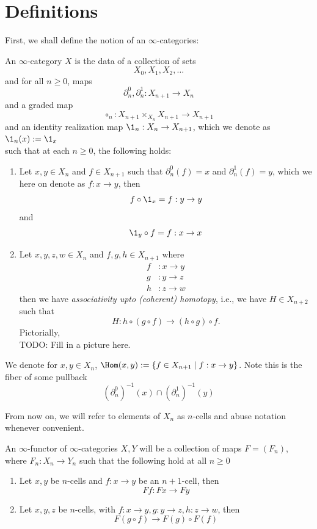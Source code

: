 \section{Definitions}

First, we shall define the notion of an $\infty$-categories:

  An $\infty$-category $X$ is the data of a collection of sets 
\[
    X_0, X_1, X_2, \ldots 
\]
  and for all $n \geq 0$,
  maps \[\partial_n^0, \partial_n^1 : X_{n+1} \rightarrow X_n\]
  and a graded map \\
  \[\circ_n : X_{n+1} \times_{X_n} X_{n+1} \rightarrow X_{n+1} \] 
  and an identity realization map $\1_n : X_n \rightarrow X_{n+1}$, which we denote as
  $\1_n(x) := \1_x$ \\
  such that at each $n \geq 0$, the following holds:
  \begin{enumerate}
    \item [(i)] Let $x, y \in X_n$ and $f \in X_{n+1}$ such that $\partial_n^0 (f) = x$ and $ \partial_n^1 (f) = y$,
      which we here on denote as $f : x \to y$, then
      \[ f \circ \1_x = f : y \to y\] and \[ \1_y \circ f = f : x \to x\]
    \item [(ii)] Let $x, y, z, w \in X_n$ and $f, g, h \in X_{n+1}$ where 
      \begin{align*}
        f &: x \to y \\
        g &: y \to z \\
        h &: z \to w
      \end{align*}
      then we have \textit{associativity upto (coherent) homotopy}, i.e., we have $H \in X_{n+2}$ such that 
      \[H : h \circ (g \circ f) \to (h \circ g) \circ f.\]
      Pictorially,\\
      {TODO: Fill in a picture here.}
 \end{enumerate}

 We denote for $x, y \in X_n$, $\Hom(x,y) := \{f \in X_{n+1} \mid f : x \to y\}$.
 Note this is the fiber of some pullback 
 \[(\partial_n^0)^{-1}(x) \cap (\partial_n^1)^{-1}(y) \]

 From now on, we will refer to elements of $X_n$ as $n$-cells and abuse notation whenever convenient.

 \begin{definition}
   An $\infty$-functor of $\infty$-categories $X, Y$ will be a collection of maps $F = (F_n)$, where
   $F_n: X_n \to Y_n$ such that the following hold at all $n \geq 0$
   \begin{enumerate}
     \item [(i)] Let $x,y$ be $n$-cells and $f : x \to y$ be an $n+1$-cell, then \[Ff : Fx \to Fy\] 
     \item [(ii)] Let $x, y, z$ be $n$-cells, with $f : x \to y, g : y \to z, h : z \to w$, then
       \[ F(g \circ f) \to F(g) \circ F(f)\] 
   \end{enumerate}
 \end{definition}
